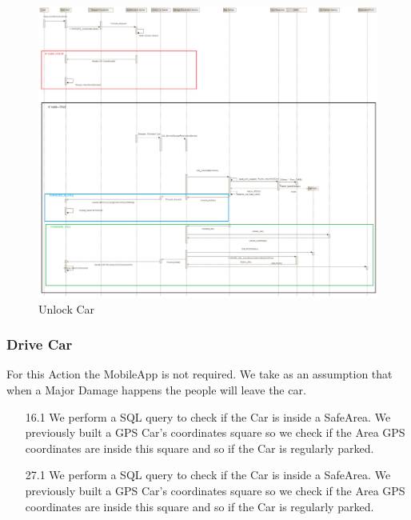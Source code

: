 \documentclass[12pt]{article}
\begin{document}
\begin{figure}[h]
	\centering
	\includegraphics[width=\textwidth]{../Images/Sequence_Final/Unlock_Car}
	\caption{Unlock Car}
\end{figure}
\clearpage
\subsubsection{Drive Car}
For this Action the MobileApp is not required.
We take as an assumption that when a Major Damage happens the people will leave the car.
\begin{enumerate}
	\item[16.1] We perform a SQL query to check if the Car is inside a SafeArea. We previously built a GPS Car’s coordinates square so we check if the Area GPS coordinates are inside this square and so if the Car is regularly parked.
	\item[27.1] We perform a SQL query to check if the Car is inside a SafeArea. We previously built a GPS Car’s coordinates square so we check if the Area GPS coordinates are inside this square and so if the Car is regularly parked.
\end{enumerate}
\end{document}
